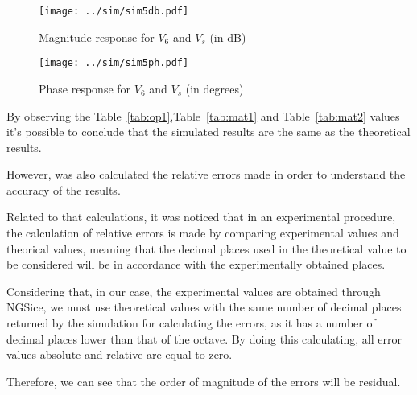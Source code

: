 \begin{figure}[H] \centering
\texttt{[image: ../sim/sim5db.pdf]}
\caption{Magnitude response for $V_{6}$ and $V_{s}$ (in dB)} 
\label{fig:sim5db}
\end{figure}

\begin{figure}[H] \centering
\texttt{[image: ../sim/sim5ph.pdf]}
\caption{Phase response for $V_{6}$ and $V_{s}$ (in degrees)} 
\label{fig:sim5ph}
\end{figure}



By observing the Table~\ref{tab:op1},Table~\ref{tab:mat1} and Table~\ref{tab:mat2} values it's possible to conclude that the simulated results are the same as the theoretical results.%


However, was also calculated the relative errors made in order to understand the accuracy of the results. 

Related to that calculations, it was noticed that in an experimental procedure, the calculation of relative errors is made by comparing experimental values and theorical values, meaning that the decimal places used in the theoretical value to be considered will be in accordance with the experimentally obtained places.


Considering that, in our case, the experimental values are obtained through NGSice, we must use theoretical values with the same number of decimal places returned by the simulation for calculating the errors, as it has a number of decimal places lower than that of the octave. By doing this calculating, all error values absolute and relative are equal to zero. 

Therefore, we can see that the order of magnitude of the errors will be residual.





